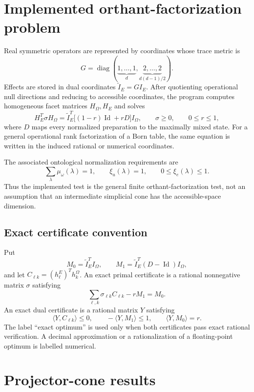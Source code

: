 \documentclass[11pt]{article}
\newcommand{\Id}{\operatorname{Id}}
\begin{document}
\section{Implemented orthant-factorization problem}

Real symmetric operators are represented by coordinates whose trace metric is
\[
G=\operatorname{diag}(\underbrace{1,\ldots,1}_{d},
\underbrace{2,\ldots,2}_{d(d-1)/2}).
\]
Effects are stored in dual coordinates $\widetilde I_E=GI_E$.  After quotienting
operational null directions and reducing to accessible coordinates, the
program computes homogeneous facet matrices $H_\Omega,H_E$ and solves
\[
H_E^T\sigma H_\Omega=
\widetilde I_E^T\bigl[(1-r)\Id+rD\bigr]I_\Omega,
\qquad \sigma\ge0,\qquad 0\le r\le1,
\]
where $D$ maps every normalized preparation to the maximally mixed state.
For a general operational rank factorization of a Born table, the same equation
is written in the induced rational or numerical coordinates.

The associated ontological normalization requirements are
\[
\sum_\lambda\mu_\omega(\lambda)=1,
\qquad \xi_u(\lambda)=1,
\qquad 0\le\xi_e(\lambda)\le1.
\]
Thus the implemented test is the general finite orthant-factorization test, not
an assumption that an intermediate simplicial cone has the accessible-space
dimension.

\subsection{Exact certificate convention}

Put
\[
M_0=\widetilde I_E^TI_\Omega,
\qquad M_1=\widetilde I_E^T(D-\Id)I_\Omega,
\]
and let $C_{\ell k}=(h^E_\ell)^Th^\Omega_k$.  An exact primal certificate is a
rational nonnegative matrix $\sigma$ satisfying
\[
\sum_{\ell,k}\sigma_{\ell k}C_{\ell k}-rM_1=M_0.
\]
An exact dual certificate is a rational matrix $Y$ satisfying
\[
\langle Y,C_{\ell k}\rangle\le0,
\qquad -\langle Y,M_1\rangle\le1,
\qquad \langle Y,M_0\rangle=r.
\]
The label ``exact optimum'' is used only when both certificates pass exact
rational verification.  A decimal approximation or a rationalization of a
floating-point optimum is labelled numerical.

\section{Projector-cone results}
\end{document}
